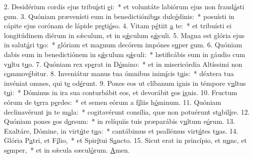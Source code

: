 2. Desidérium cordis ejus tribu\uline{í}sti \uline{e}i:~* et voluntáte labiórum ejus non fraud\uline{á}sti \uline{e}um.
3. Quóniam prævenísti eum in benedictiónib\uline{u}s dulc\uline{é}dinis:~* posuísti in cápite ejus corónam de lápide pr\uline{e}ti\uline{ó}so.
4. Vitam p\uline{é}tiit \uline{a} te:~* et tribuísti ei longitúdinem diérum in sǽculum, et in s\uline{ǽ}culum s\uline{ǽ}culi.
5. Magna est glória ejus in salut\uline{á}ri t\uline{u}o:~* glóriam et magnum decórem impónes s\uline{u}per \uline{e}um.
6. Quóniam dabis eum in benedictiónem in s\uline{ǽ}culum s\uline{ǽ}culi:~* lætificábis eum in gáudio cum v\uline{u}ltu t\uline{u}o.
7. Quóniam rex sp\uline{e}rat in D\uline{ó}mino:~* et in misericórdia Altíssimi non c\uline{o}mmov\uline{é}bitur.
8. Inveniátur manus tua ómnibus inim\uline{í}cis t\uline{u}is:~* déxtera tua invéniat omnes, qui t\uline{e} od\uline{é}runt.
9. Pones eos ut clíbanum ignis in témpore v\uline{u}ltus t\uline{u}i:~* Dóminus in ira sua conturbábit eos, et devorábit \uline{e}os \uline{i}gnis.
10. Fructum eórum de t\uline{e}rra p\uline{e}rdes:~* et semen eórum a f\uline{í}liis h\uline{ó}minum.
11. Quóniam declinavérunt \uline{i}n te m\uline{a}la:~* cogitavérunt consília, quæ non potuérunt st\uline{a}bil\uline{í}re.
12. Quóniam pones \uline{e}os d\uline{o}rsum:~* in relíquiis tuis præparábis v\uline{u}ltum e\uline{ó}rum.
13. Exaltáre, Dómine, in virt\uline{ú}te t\uline{u}a:~* cantábimus et psallémus virt\uline{ú}tes t\uline{u}as.
14. Glória P\uline{a}tri, et F\uline{í}lio,~* et Spir\uline{í}tui S\uline{a}ncto.
15. Sicut erat in princípio, et n\uline{u}nc, et s\uline{e}mper,~* et in sǽcula sæcul\uline{ó}rum. \uline{A}men.
